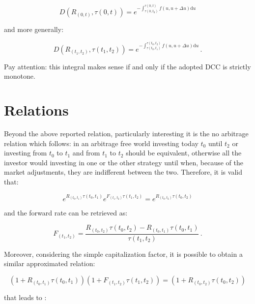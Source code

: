 \begin{equation}
D(R_{(0,t)},\tau(0,t))=e^{-\int_{\tau(0,t_{0})}^{\tau(0,t)}f(u,u+ \Delta u) \mathrm{d}u}
\label{eq:cont_compounded_interest_df_from_ifr}
\end{equation}

and more generally:

\begin{equation*}
D(R_{(t_{1},t_{2})},\tau(t_{1},t_{2}))=e^{-\int_{\tau(t_{0},t_{1})}^{\tau(t_{0},t_{2})}f(u,u+ \Delta u) \mathrm{d}u}\,.
\end{equation*}


Pay attention: this integral makes sense if and only if the adopted DCC is strictly monotone.

\section{Relations}

Beyond the above reported relation, particularly interesting it is the no arbitrage relation which follows: in an arbitrage free world investing today $t_{0}$ until $t_{2}$ or investing from $t_{0}$ to $t_{1}$ and from $t_{1}$ to $t_{2}$
should be equivalent, otherwise all the investor would investing in one or the other strategy until when, because of the market adjustments, they are indifferent between the two.
Therefore, it is valid that:

\begin{equation*}
e^{R_{(t_{0},t_{1})}\tau(t_{0},t_{1})}e^{F_{(t_{1},t_{2})}\tau(t_{1},t_{2})}=e^{R_{(t_{0},t_{2})}\tau(t_{0},t_{2})}
\end{equation*}

and the forward rate can be retrieved as:

\begin{equation}
F_{(t_{1},t_{2})}=\dfrac{R_{(t_{0},t_{2})}\tau(t_{0},t_{2})-R_{(t_{0},t_{1})}\tau(t_{0},t_{1})}{\tau(t_{1},t_{2})}\,.
\label{eq:no_arbitrage_forward_cc}
\end{equation}

Moreover, considering the simple capitalization factor, it is possible to obtain a similar approximated relation:

\begin{equation*}
(1+R_{(t_{0},t_{1})}\tau(t_{0},t_{1}))(1+ F_{(t_{1},t_{2})}\tau(t_{1},t_{2}))=(1 + R_{(t_{0},t_{2})}\tau(t_{0},t_{2}))
\end{equation*}

that leads to :

